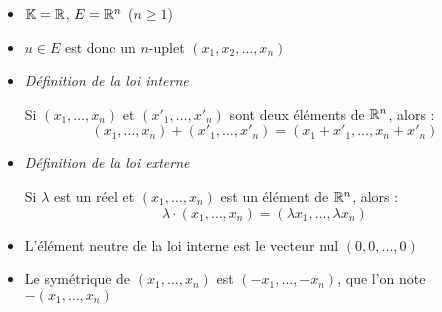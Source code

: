 \begin{frame}
\centerline{}

\begin{itemize}[<+->]
  \item $\mathbb{K}=\mathbb{R}$, $E=\mathbb{R}^n$ ($n\ge1$) 
  
  \item $u\in E$ est donc un $n$-uplet $(x_1,x_2, \ldots , x_n)$

  \item \emph{Définition de la loi interne} 
  
  Si $(x_1, \dots , x_n)$ et $(x'_1, \dots , x'_n)$ sont deux éléments de $\mathbb{R}^n$, alors :
  $$(x_1, \dots , x_n)+(x'_1, \dots , x'_n) =  (x_1+x'_1, \dots , x_n+x'_n)$$    
  
  
  \item \emph{Définition  de la loi externe}
  
      Si $\lambda$ est un réel et $(x_1, \dots , x_n)$ est un élément de $\mathbb{R}^n$, alors :
  $$\lambda \cdot (x_1, \dots , x_n)=(\lambda x_1,\dots ,  \lambda x_n)$$
    
  \item L'élément neutre de la loi interne est le vecteur nul $(0,0, \dots, 0)$
  
  \item Le symétrique de    $(x_1, \dots , x_n)$ est $(-x_1, \dots , -x_n)$, que l'on note 
$-(x_1, \dots , x_n)$
\end{itemize}


\end{frame}


